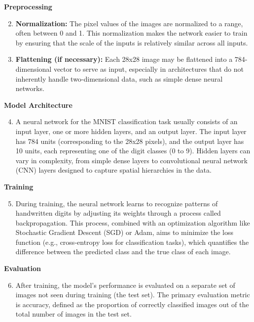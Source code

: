 \textbf{Preprocessing}

\begin{enumerate}
    \setcounter{enumi}{1}
    \item \textbf{Normalization:} The pixel values of the images are normalized to a range, often between 0 and 1. This normalization makes the network easier to train by ensuring that the scale of the inputs is relatively similar across all inputs.
    \item \textbf{Flattening (if necessary):} Each 28x28 image may be flattened into a 784-dimensional vector to serve as input, especially in architectures that do not inherently handle two-dimensional data, such as simple dense neural networks.
\end{enumerate}

\textbf{Model Architecture}

\begin{enumerate}
    \setcounter{enumi}{3}
    \item A neural network for the MNIST classification task usually consists of an input layer, one or more hidden layers, and an output layer. The input layer has 784 units (corresponding to the 28x28 pixels), and the output layer has 10 units, each representing one of the digit classes (0 to 9). Hidden layers can vary in complexity, from simple dense layers to convolutional neural network (CNN) layers designed to capture spatial hierarchies in the data.
\end{enumerate}

\textbf{Training}

\begin{enumerate}
    \setcounter{enumi}{4}
    \item During training, the neural network learns to recognize patterns of handwritten digits by adjusting its weights through a process called backpropagation. This process, combined with an optimization algorithm like Stochastic Gradient Descent (SGD) or Adam, aims to minimize the loss function (e.g., cross-entropy loss for classification tasks), which quantifies the difference between the predicted class and the true class of each image.
\end{enumerate}

\textbf{Evaluation}

\begin{enumerate}
    \setcounter{enumi}{5}
    \item After training, the model's performance is evaluated on a separate set of images not seen during training (the test set). The primary evaluation metric is accuracy, defined as the proportion of correctly classified images out of the total number of images in the test set.
\end{enumerate}

